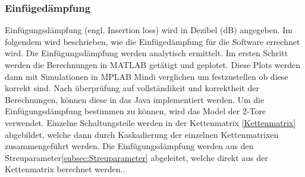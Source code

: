 \subsubsection{Einfügedämpfung}\label{subsec:einfuge}


Einfügungsdämpfung (engl. Insertion loss) wird in Dezibel (dB) angegeben. Im folgendem wird beschrieben, wie die Einfügedämpfung für die Software errechnet wird.  Die Einfügungsdämpfung werden analytisch ermittelt. Im ersten Schritt werden die Berechnungen in MATLAB getätigt und geplotet. Diese Plots werden dann mit Simulationen in MPLAB Mindi verglichen um festzustellen ob diese korrekt sind. Nach überprüfung auf vollständikeit und korrektheit der Berechnungen, können diese in das Java implementiert werden.  Um die Einfügungsdämpfung bestimmen zu können, wird das Model der 2-Tore verwendet. Einzelne Schaltungsteile werden in der Kettenmatrix \ref{Kettenmatrix} abgebildet, welche dann durch Kaskadierung der einzelnen Kettenmatrixen zusammengeführt werden. Die Einfügungsdämpfung werden aus den Streuparameter\ref{subsec:Streuparameter} abgeleitet, welche direkt aus der Kettenmatrix berechnet werden.\cite{hftech}.


